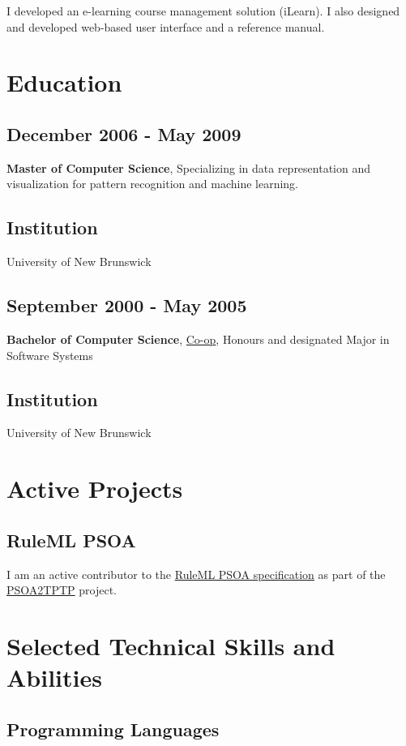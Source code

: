 \documentclass[11pt]{article}
\begin{document}
I developed an e-learning course management solution (iLearn).  I also designed and developed web-based user interface and a reference manual.
\section{Education}
\label{sec-3}
\subsection{December 2006 - May 2009}
\label{sec-3-1}

\textbf{Master of Computer Science}, Specializing in data representation and visualization for pattern recognition and machine learning.
\subsection{Institution}
\label{sec-3-2}

University of New Brunswick
\subsection{September 2000 - May 2005}
\label{sec-3-3}

\textbf{Bachelor of Computer Science}, \href{http://www.unb.ca/fredericton/cs/undergrad/bcs/index.html}{Co-op}, Honours and designated Major in Software Systems
\subsection{Institution}
\label{sec-3-4}

University of New Brunswick
\section{Active Projects}
\label{sec-4}
\subsection{RuleML PSOA}
\label{sec-4-1}

I am an active contributor to the \href{http://ruleml.org/#PSOA}{RuleML PSOA specification} as part of the \href{http://reubenpeterpaul.github.com/PSOA-to-TPTP/}{PSOA2TPTP} project.
\section{Selected Technical Skills and Abilities}
\label{sec-5}
\subsection{Programming Languages}
\label{sec-5-1}
\end{document}
